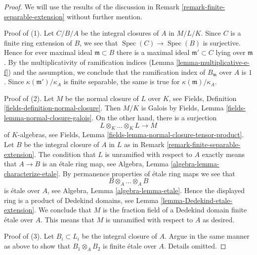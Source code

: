 \documentclass[10pt,a4paper]{amsart}
\theoremstyle{plain}
\theoremstyle{definition}
\theoremstyle{remark}
\numberwithin{equation}{subsection}
\def\Spec{\mathop{\mathrm{Spec}}}
\begin{document}
\begin{proof}
We will use the results of the discussion in
Remark \ref{remark-finite-separable-extension}
without further mention.

\medskip\noindent
Proof of (1). Let $C/B/A$ be the integral closures of $A$ in $M/L/K$.
Since $C$ is a finite ring extension of $B$, we see that
$\Spec(C) \to \Spec(B)$ is surjective. Hence for ever maximal
ideal $\mathfrak m \subset B$ there is a maximal ideal
$\mathfrak m' \subset C$ lying over $\mathfrak m$.
By the multiplicativity of ramification indices
(Lemma \ref{lemma-multiplicative-e-f})
and the assumption, we conclude that the ramification
index of $B_\mathfrak m$ over $A$ is $1$.
Since $\kappa(\mathfrak m')/\kappa_A$ is finite separable,
the same is true for $\kappa(\mathfrak m)/\kappa_A$.

\medskip\noindent
Proof of (2). Let $M$ be the normal closure of $L$ over $K$, see
Fields, Definition \ref{fields-definition-normal-closure}.
Then $M/K$ is Galois by Fields, Lemma \ref{fields-lemma-normal-closure-galois}.
On the other hand, there is a surjection
$$
L \otimes_K \ldots \otimes_K L \longrightarrow M
$$
of $K$-algebras, see Fields, Lemma
\ref{fields-lemma-normal-closure-tensor-product}.
Let $B$ be the integral closure of $A$ in $L$
as in Remark \ref{remark-finite-separable-extension}. The
condition that $L$ is unramified with respect to $A$
exactly means that $A \to B$ is an \'etale ring map, see
Algebra, Lemma \ref{algebra-lemma-characterize-etale}.
By permanence properties of \'etale ring maps we see that
$$
B \otimes_A \ldots \otimes_A B
$$
is \'etale over $A$, see
Algebra, Lemma \ref{algebra-lemma-etale}.
Hence the displayed ring is a product of Dedekind domains, see
Lemma \ref{lemma-Dedekind-etale-extension}.
We conclude that $M$ is the fraction field of a
Dedekind domain finite \'etale over $A$.
This means that $M$ is unramified with respect to $A$
as desired.

\medskip\noindent
Proof of (3). Let $B_i \subset L_i$ be the integral closure of $A$.
Argue in the same manner as above to show that $B_1 \otimes_A B_2$
is finite \'etale over $A$. Details omitted.
\end{proof}
\end{document}
